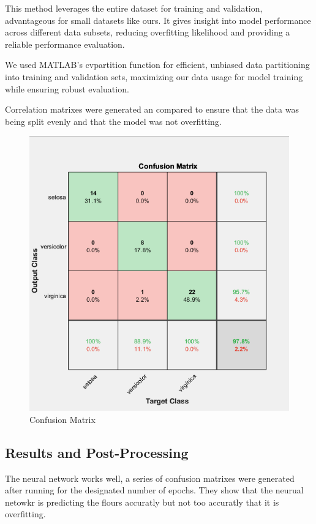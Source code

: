 \documentclass[conference]{inc/IEEEtran}
\begin{document}
This method leverages the entire dataset for training and validation, advantageous for small datasets like ours. It gives insight into model performance across different data subsets, reducing overfitting likelihood and providing a reliable performance evaluation.

We used MATLAB's cvpartition function for efficient, unbiased data partitioning into training and validation sets, maximizing our data usage for model training while ensuring robust evaluation.

Correlation matrixes were generated an compared to ensure that the data was being split evenly and that the model was not overfitting.

\begin{figure}
    \includegraphics[width=\linewidth]{figures/Cm.png}
    \caption{Confusion Matrix}
    \label{fig:boat1}
  \end{figure}

\subsection{Results and Post-Processing}

The neural network works well, a series of confusion matrixes were generated after running for the designated number of epochs. They show that the neurual netowkr is predicting the flours accuratly but not too accuratly that it is overfitting. 
\end{document}
